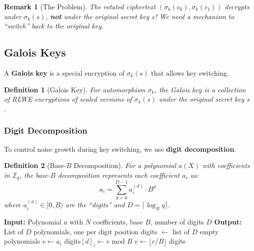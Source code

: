 \documentclass[11pt,a4paper]{article}
\newtheorem{definition}{Definition}
\newtheorem{remark}{Remark}
\newcommand{\Z}{\mathbb{Z}}
\newcommand{\bmod}{\text{ mod }}
\begin{document}
\begin{remark}[The Problem]
The rotated ciphertext $(\sigma_k(c_0), \sigma_k(c_1))$ decrypts under $\sigma_k(s)$, \textbf{not} under the original secret key $s$! We need a mechanism to ``switch'' back to the original key.
\end{remark}

\subsection{Galois Keys}

A \textbf{Galois key} is a special encryption of $\sigma_k(s)$ that allows key switching.

\begin{definition}[Galois Key]
For automorphism $\sigma_k$, the Galois key is a collection of RLWE encryptions of scaled versions of $\sigma_k(s)$ under the original secret key $s$.
\end{definition}

\subsubsection{Digit Decomposition}

To control noise growth during key switching, we use \textbf{digit decomposition}.

\begin{definition}[Base-$B$ Decomposition]
For a polynomial $a(X)$ with coefficients in $\Z_q$, the base-$B$ decomposition represents each coefficient $a_i$ as:
\[
a_i = \sum_{d=0}^{D-1} a_i^{(d)} \cdot B^d
\]
where $a_i^{(d)} \in [0, B)$ are the ``digits'' and $D = \lceil \log_B q \rceil$.
\end{definition}

\begin{algorithm}[H]
\caption{Polynomial Digit Decomposition}
\begin{algorithmic}[1]
    \State \textbf{Input:} Polynomial $a$ with $N$ coefficients, base $B$, number of digits $D$
    \State \textbf{Output:} List of $D$ polynomials, one per digit position
    \State
    \State digits $\gets$ list of $D$ empty polynomials
        \State $v \gets a_i$
            \State digits$[d]_i \gets v \bmod B$
            \State $v \gets \lfloor v / B \rfloor$
        \EndFor
    \EndFor
    \State \Return digits
\EndFunction
\end{algorithmic}
\end{algorithm}
\end{document}
